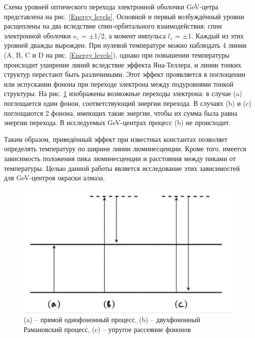 Схема уровней оптического перехода электронной оболочки GeV-цетра представлена 
на рис. \ref{Energy levels}. Основной и первый возбуждённый уровни расщеплены на два вследствие
спин-орбитального взаимодействия: спин электронной оболочки $s_z$ = $\pm$1/2,
а момент импульса $l_z$ = $\pm$1. Каждый из этих уровней дважды вырожден.
При нулевой температуре можно наблюдать
4 линии (A, B, C и D на рис. \ref{Energy levels}), однако при повышении температуры
происходит уширение линий вследствие эффекта Яна-Теллера, и линии тонких структур
перестают быть различимыми. Этот эффект
проявляется в поглощении или испускании фонона при переходе электрона между
подуровнями тонкой структуры. На рис. \ref{J-T effect} изображены возможные переходы электрона:
в случае (a) поглощается один фонон, соответствующий энергии перехода. В случаях
(b) и (c) поглощаются 2 фонона, имеющих такие энергии, чтобы их сумма была 
равна энергии перехода. В исследуемых GeV-центрах процесс (b) не происходит.

Таким образом, приведённый эффект при известных константах позволяет определять 
температуру по ширине линии люминесценции. Кроме того, имеется зависимость 
положения пика люминесценции и расстояния между пиками от температуры. Целью
данной работы является исследование этих зависимостей для GeV-центров окраски 
алмаза.  



\begin{figure}[!h]
    \begin{center}
        \includegraphics[width=0.5 \linewidth]{Jahn-Teller effect.jpg}
        \caption{(a) -- прямой однофононный процесс, (b) -- двухфононный
        Рамановский процесс, (c) -- упругое рассеяние фононов}
        \label{J-T effect}
    \end{center}
\end{figure}



